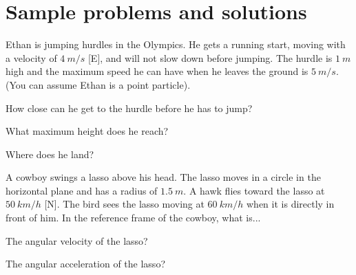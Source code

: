 \section{Sample problems and solutions}
\begin{problemParts}{Ethan is jumping hurdles in the Olympics. He gets a running start, moving with a velocity of $\SI{4}{m/s}$ [E], and will not slow down before jumping. The hurdle is $\SI{1}{m}$ high and the maximum speed he can have when he leaves the ground is $\SI{5}{m/s}$. (You can assume Ethan is a point particle).}
\item How close can he get to the hurdle before he has to jump?
\item What maximum height does he reach?
\item Where does he land?
\end{problemParts}

\begin{problemParts}{A cowboy swings a lasso above his head. The lasso moves in a circle in the horizontal plane and has a radius of $\SI{1.5}{m}$. A hawk flies toward the lasso at $\SI{50}{km/h}$ [N]. The bird sees the lasso moving at $\SI{60}{km/h}$ when it is directly in front of him. In the reference frame of the cowboy, what is...}
\item The angular velocity of the lasso?
\item The angular acceleration of the lasso? 
\end{problemParts} 
